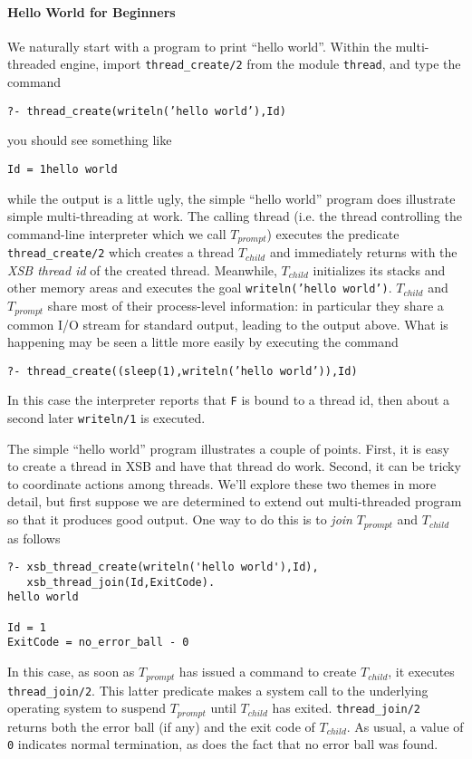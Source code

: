 \paragraph{Hello World for Beginners}
%
We naturally start with a program to print ``hello world''.  Within
the multi-threaded engine, import {\tt thread\_create/2} from the
module {\tt thread}, and type the command
\begin{center} 
{\tt ?- thread\_create(writeln('hello world'),Id)} 
\end{center} 
you should see something like 
\begin{center} 
{\tt Id = 1hello world} 
\end{center} 
%
while the output is a little ugly, the simple ``hello world'' program
does illustrate simple multi-threading at work.  The calling thread
(i.e. the thread controlling the command-line interpreter which we
call $T_{prompt}$) executes the predicate {\tt thread\_create/2}
which creates a thread $T_{child}$ and immediately returns with the
{\em XSB thread id} of the created thread.  Meanwhile, $T_{child}$
initializes its stacks and other memory areas and executes the goal
{\tt writeln('hello world')}.  $T_{child}$ and $T_{prompt}$ share most
of their process-level information: in particular they share a common
I/O stream for standard output, leading to the output above.  What is
happening may be seen a little more easily by executing the command
%
\begin{center} 
{\tt ?- thread\_create((sleep(1),writeln('hello world')),Id)} 
\end{center} 
%
In this case the interpreter reports that {\tt F} is bound to a thread
id, then about a second later {\tt writeln/1} is executed.  

The simple ``hello world'' program illustrates a couple of points.
First, it is easy to create a thread in XSB and have that thread do
work.  Second, it can be tricky to coordinate actions among threads.
We'll explore these two themes in more detail, but first suppose we
are determined to extend out multi-threaded program so that it
produces good output.  One way to do this is to {\em join}
$T_{prompt}$ and $T_{child}$ as follows 
%
\begin{verbatim}
?- xsb_thread_create(writeln('hello world'),Id),
   xsb_thread_join(Id,ExitCode).
hello world

Id = 1
ExitCode = no_error_ball - 0
\end{verbatim}
%
In this case, as soon as $T_{prompt}$ has issued a command to create
$T_{child}$, it executes {\tt thread\_join/2}.  This latter predicate
makes a system call to the underlying operating system to suspend
$T_{prompt}$ until $T_{child}$ has exited.  {\tt thread\_join/2}
returns both the error ball (if any) and the exit code of $T_{child}$.
As usual, a value of {\tt 0} indicates normal termination, as does the
fact that no error ball was found.

